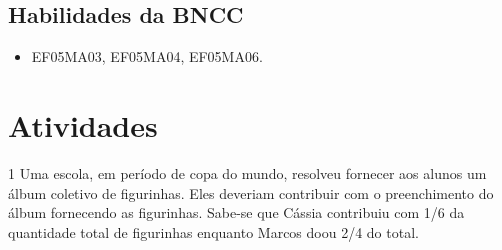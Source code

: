 \subsection{Habilidades da BNCC}

\begin{itemize}
\item EF05MA03, EF05MA04, EF05MA06.
\end{itemize}



\section*{Atividades}

\num{1} Uma escola, em período de copa do mundo, resolveu fornecer aos
alunos um álbum coletivo de figurinhas. Eles deveriam contribuir com o
preenchimento do álbum fornecendo as figurinhas. Sabe-se que Cássia
contribuiu com 1/6 da quantidade total de figurinhas enquanto Marcos doou 2/4 do total.

